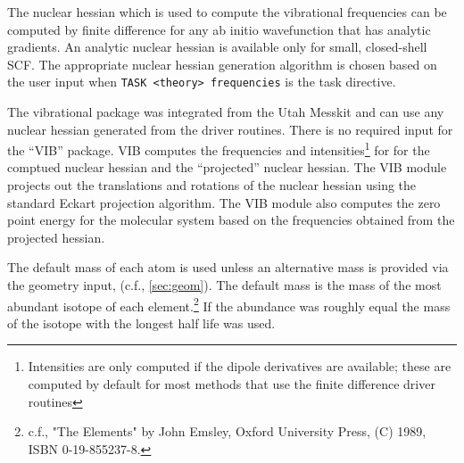 
The nuclear hessian which is used to compute the vibrational
frequencies can be computed by finite difference for any ab initio
wavefunction that has analytic gradients.  An analytic nuclear hessian
is available only for small, closed-shell SCF.  The appropriate
nuclear hessian generation algorithm is chosen based on the user input
when \verb+TASK <theory> frequencies+ is the task directive.

The vibrational package was integrated from the Utah Messkit and can
use any nuclear hessian generated from the driver routines.  There is
no required input for the ``VIB'' package.  VIB computes the
frequencies and intensities\footnote{Intensities are only computed if
  the dipole derivatives are available; these are computed by default
  for most methods that use the finite difference driver routines} for
for the comptued nuclear hessian and the ``projected'' nuclear
hessian.  The VIB module projects out the translations and rotations
of the nuclear hessian using the standard Eckart projection algorithm.
The VIB module also computes the zero point energy for the molecular
system based on the frequencies obtained from the projected hessian.

The default mass of each atom is used unless an alternative mass is
provided via the geometry input, (c.f., \ref{sec:geom}).  The default
mass is the mass of the most abundant isotope of each
element.\footnote{c.f., "The Elements" by John Emsley, Oxford
  University Press, (C) 1989, ISBN 0-19-855237-8.} If the abundance
was roughly equal the mass of the isotope with the longest half life
was used.


